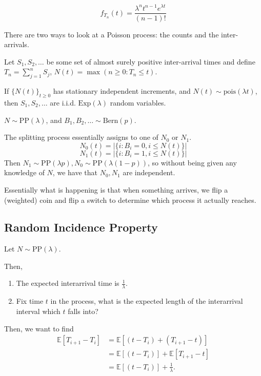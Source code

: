 \documentclass{article}
\newcommand{\EE}{\mathbb{E}}
\newcommand{\pois}{\mathrm{pois}}
\begin{document}
\begin{definition} 
	\[f_{T_n}(t) = \frac{\lambda^n t^{n-1} e^{\lambda t}}{(n-1)!}\]
\end{definition}

There are two ways to look at a Poisson process: the counts and the inter-arrivals.

\begin{theorem}
	Let $S_1, S_2, \ldots$ be some set of almost surely positive inter-arrival times and define $T_n = \sum_{j=1}^n S_j$, $N(t) = \max(n \geq 0 : T_n \leq t)$.

	If $\{N(t)\}_{t \geq 0}$ has stationary independent increments, and $N(t) \sim \pois(\lambda t)$, then $S_1, S_2, \ldots$ are i.i.d. $\mathrm{Exp}(\lambda)$ random variables.
\end{theorem}

\begin{definition}[Splitting] 
	$N \sim \mathrm{PP}(\lambda)$, and $B_1, B_2, \ldots \sim \mathrm{Bern}(p)$. 

	The splitting process essentially assigns to one of $N_0$ or $N_1$. 
	\[N_0(t) = |\{ i : B_i = 0, i \leq N(t)\}|\] 
	\[N_1(t) = |\{ i : B_i = 1, i \leq N(t)\}|\]
	Then $N_1 \sim \mathrm{PP}(\lambda p), N_0 \sim \mathrm{PP}(\lambda(1 - p))$, so without being given any knowledge of $N$, we have that $N_0, N_1$ are independent.  
\end{definition}

Essentially what is happening is that when something arrives, we flip a (weighted) coin and flip a switch to determine which process it actually reaches.

\subsection{Random Incidence Property} 
Let $N \sim \mathrm{PP}(\lambda)$. 

Then, 
\begin{enumerate} 
	\item The expected interarrival time is $\frac{1}{\lambda}$. 
	\item Fix time $t$ in the process, what is the expected length of the 
		interarrival interval which $t$ falls into? 
\end{enumerate} 

Then, we want to find 
\begin{align*}
	\EE[T_{i+1} - T_i] &= \EE[(t - T_i) + (T_{i+1} - t)] \\
					   &= \EE[(t - T_i)] + \EE[T_{i+1} - t] \\
					   &= \EE[(t - T_i)] + \frac{1}{\lambda}.
\end{align*}
\end{document}

